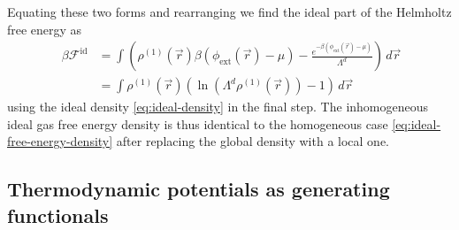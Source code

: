 Equating these two forms and rearranging we find the ideal part of the Helmholtz free energy as
\begin{align}\
  \beta \mathcal{F}^\mathrm{id}
  &=
  \int
  \left(
  \rho^{(1)}(\vec{r}) \beta (\phi_\mathrm{ext}(\vec{r}) - \mu)
  - \frac{e^{-\beta (\phi_\mathrm{ext}(\vec{r}) - \mu)}}{\Lambda^d}
  \right)
  \, d\vec{r}
  \nonumber \\ &=
  \int
  \rho^{(1)}(\vec{r})
  \left(
  \ln{(\Lambda^d \rho^{(1)}(\vec{r}))} - 1
  \right)
  \, d\vec{r}
  \label{eq:ideal-free-energy-functional}
\end{align}
using the ideal density \eqref{eq:ideal-density} in the final step.
The inhomogeneous ideal gas free energy density is thus identical to the homogeneous case \eqref{eq:ideal-free-energy-density} after replacing the global density with a local one.

\subsection{Thermodynamic potentials as generating functionals}

